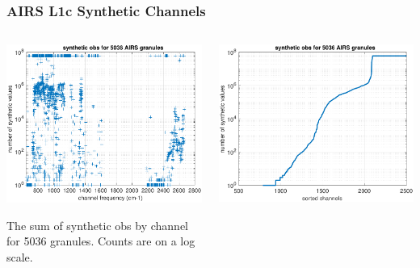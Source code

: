 \documentclass[9pt]{beamer}
\begin{document}
\begin{frame}
\frametitle{AIRS L1c Synthetic Channels}
\begin{columns}[t]
\begin{column}{0.5\textwidth}  
  \begin{centering}
  \includegraphics[width=\textwidth]{figures/synth_obs_freq_order.pdf}
  \end{centering}\vspace{3mm}

The sum of synthetic obs by channel for 5036 {\airs} granules.
Counts are on a log scale.

\end{column}

\begin{column}{0.5\textwidth}
  \begin{centering}
  \includegraphics[width=\textwidth]{figures/synthetic_obs_counts.pdf}
  \end{centering}\vspace{3mm}


\end{column}
\end{columns}
\end{frame}
\end{document}
